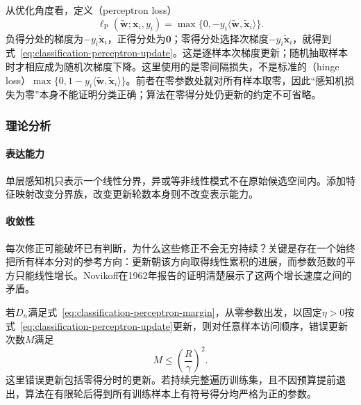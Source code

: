 从优化角度看，定义（perceptron loss）
\begin{equation}
  \label{eq:classification-perceptron-loss}
  \ell_{\mathrm{P}}(\tilde{\bm{w}};\bm{x}_i,y_i)
    =\max\{0,-y_i\langle\tilde{\bm{w}},\tilde{\bm{x}}_i\rangle\}.
\end{equation}
负得分处的梯度为$-y_i\tilde{\bm{x}}_i$，正得分处为$\bm{0}$；零得分处选择次梯度$-y_i\tilde{\bm{x}}_i$，就得到式~\eqref{eq:classification-perceptron-update}。这是逐样本次梯度更新；随机抽取样本时才相应成为随机次梯度下降。这里使用的是零间隔损失，不是标准的（hinge loss）$\max\{0,1-y_i\langle\tilde{\bm{w}},\tilde{\bm{x}}_i\rangle\}$。前者在零参数处就对所有样本取零，因此“感知机损失为零”本身不能证明分类正确；算法在零得分处仍更新的约定不可省略。

\subsubsection{理论分析}
\label{sec:classification-perceptron-analysis}

\paragraph{表达能力}
单层感知机只表示一个线性分界，异或等非线性模式不在原始候选空间内。添加特征映射改变分界族，改变更新轮数本身则不改变表示能力。

\paragraph{收敛性}
每次修正可能破坏已有判断，为什么这些修正不会无穷持续？关键是存在一个始终把所有样本分对的参考方向：更新朝该方向取得线性累积的进展，而参数范数的平方只能线性增长。Novikoff在1962年报告的证明清楚展示了这两个增长速度之间的矛盾。

\begin{theorem}[感知机的错误更新界]
  \label{thm:classification-perceptron-mistakes}
  若$D_n$满足式~\eqref{eq:classification-perceptron-margin}，从零参数出发，以固定$\eta>0$按式~\eqref{eq:classification-perceptron-update}更新，则对任意样本访问顺序，错误更新次数$M$满足
  \[
    M\leq\left(\frac R\gamma\right)^2 .
  \]
  这里错误更新包括零得分时的更新。若持续完整遍历训练集，且不因预算提前退出，算法在有限轮后得到所有训练样本上有符号得分均严格为正的参数。
\end{theorem}


